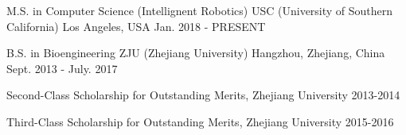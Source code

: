 


\begin{cventries}

\cventry
{M.S. in Computer Science (Intellignent Robotics)} %
{USC (University of Southern California)} %
{Los Angeles, USA} %
{Jan. 2018 - PRESENT} %
{%
\begin{cvitems}
\end{cvitems}
}

\cventry
{B.S. in Bioengineering} %
{ZJU (Zhejiang University)} %
{Hangzhou, Zhejiang, China} %
{Sept. 2013 - July. 2017} %
{ %
\begin{cvitems}
\item {Second-Class Scholarship for Outstanding Merits, Zhejiang University    2013-2014}
\item {Third-Class Scholarship for Outstanding Merits, Zhejiang University    2015-2016}
\end{cvitems}
}

\end{cventries}